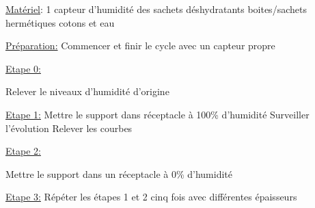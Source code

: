 \noindent \underline{Matériel}: 
1 capteur d'humidité des sachets déshydratants boites/sachets hermétiques cotons et eau \newline 

\noindent \underline{Préparation:} \newline  
Commencer et finir le cycle avec un capteur propre\newline  

\noindent \underline{Etape 0:}  

\noindent Relever le niveaux d'humidité d'origine  

\noindent \underline{Etape 1:} \newline  
Mettre le support dans réceptacle à 100\% d'humidité\newline  
Surveiller l'évolution\newline  
Relever les courbes

\noindent \underline{Etape 2:} 

\noindent Mettre le support dans un réceptacle à 0\% d'humidité 

\noindent \underline{Etape 3:}  \newline
Répéter les  étapes 1 et 2 cinq fois avec différentes épaisseurs

